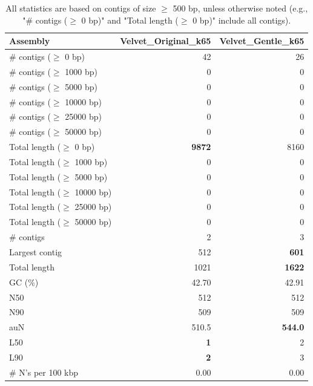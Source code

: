 \documentclass[12pt,a4paper]{article}
\begin{document}
\begin{table}[ht]
\begin{center}
\caption{All statistics are based on contigs of size $\geq$ 500 bp, unless otherwise noted (e.g., "\# contigs ($\geq$ 0 bp)" and "Total length ($\geq$ 0 bp)" include all contigs).}
\begin{tabular}{|l*{2}{|r}|}
\hline
Assembly & Velvet\_Original\_k65 & Velvet\_Gentle\_k65 \\ \hline
\# contigs ($\geq$ 0 bp) & 42 & 26 \\ \hline
\# contigs ($\geq$ 1000 bp) & 0 & 0 \\ \hline
\# contigs ($\geq$ 5000 bp) & 0 & 0 \\ \hline
\# contigs ($\geq$ 10000 bp) & 0 & 0 \\ \hline
\# contigs ($\geq$ 25000 bp) & 0 & 0 \\ \hline
\# contigs ($\geq$ 50000 bp) & 0 & 0 \\ \hline
Total length ($\geq$ 0 bp) & {\bf 9872} & 8160 \\ \hline
Total length ($\geq$ 1000 bp) & 0 & 0 \\ \hline
Total length ($\geq$ 5000 bp) & 0 & 0 \\ \hline
Total length ($\geq$ 10000 bp) & 0 & 0 \\ \hline
Total length ($\geq$ 25000 bp) & 0 & 0 \\ \hline
Total length ($\geq$ 50000 bp) & 0 & 0 \\ \hline
\# contigs & 2 & 3 \\ \hline
Largest contig & 512 & {\bf 601} \\ \hline
Total length & 1021 & {\bf 1622} \\ \hline
GC (\%) & 42.70 & 42.91 \\ \hline
N50 & 512 & 512 \\ \hline
N90 & 509 & 509 \\ \hline
auN & 510.5 & {\bf 544.0} \\ \hline
L50 & {\bf 1} & 2 \\ \hline
L90 & {\bf 2} & 3 \\ \hline
\# N's per 100 kbp & 0.00 & 0.00 \\ \hline
\end{tabular}
\end{center}
\end{table}
\end{document}
